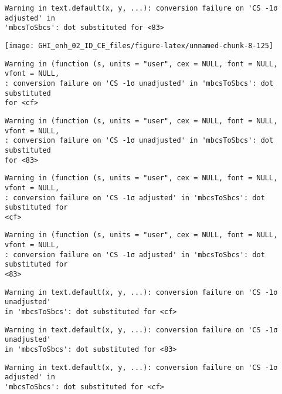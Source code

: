 \documentclass[
  10pt,
  a4paper,oneside]{article}
\begin{document}
\begin{verbatim}
Warning in text.default(x, y, ...): conversion failure on 'CS -1σ adjusted' in
'mbcsToSbcs': dot substituted for <83>
\end{verbatim}

\begin{center}\texttt{[image: GHI\_enh\_02\_ID\_CE\_files/figure-latex/unnamed-chunk-8-125]} \end{center}

\begin{verbatim}
Warning in (function (s, units = "user", cex = NULL, font = NULL, vfont = NULL,
: conversion failure on 'CS -1σ unadjusted' in 'mbcsToSbcs': dot substituted
for <cf>
\end{verbatim}

\begin{verbatim}
Warning in (function (s, units = "user", cex = NULL, font = NULL, vfont = NULL,
: conversion failure on 'CS -1σ unadjusted' in 'mbcsToSbcs': dot substituted
for <83>
\end{verbatim}

\begin{verbatim}
Warning in (function (s, units = "user", cex = NULL, font = NULL, vfont = NULL,
: conversion failure on 'CS -1σ adjusted' in 'mbcsToSbcs': dot substituted for
<cf>
\end{verbatim}

\begin{verbatim}
Warning in (function (s, units = "user", cex = NULL, font = NULL, vfont = NULL,
: conversion failure on 'CS -1σ adjusted' in 'mbcsToSbcs': dot substituted for
<83>
\end{verbatim}

\begin{verbatim}
Warning in text.default(x, y, ...): conversion failure on 'CS -1σ unadjusted'
in 'mbcsToSbcs': dot substituted for <cf>
\end{verbatim}

\begin{verbatim}
Warning in text.default(x, y, ...): conversion failure on 'CS -1σ unadjusted'
in 'mbcsToSbcs': dot substituted for <83>
\end{verbatim}

\begin{verbatim}
Warning in text.default(x, y, ...): conversion failure on 'CS -1σ adjusted' in
'mbcsToSbcs': dot substituted for <cf>
\end{verbatim}
\end{document}
